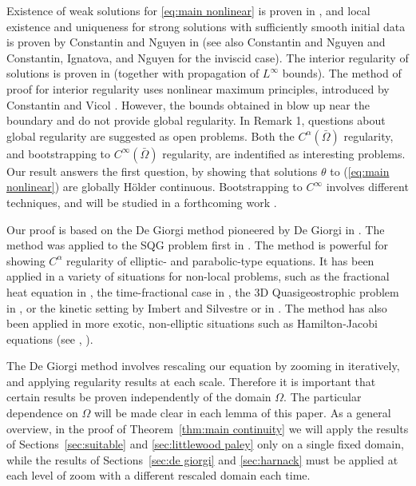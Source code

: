 \documentclass[11pt]{amsart}
\theoremstyle{remark}
\theoremstyle{definition}
\begin{document}
\vskip0.3cm
Existence of weak solutions for \eqref{eq:main nonlinear}  is proven in \cite{CoIg.fraclap}, and local existence and uniqueness for strong solutions with sufficiently smooth initial data is proven by Constantin and Nguyen in \cite{CoNg.strong} (see also Constantin and Nguyen \cite{CoNg} and Constantin, Ignatova, and Nguyen \cite{CoIgNg} for the inviscid case). The interior regularity of solutions  is proven in \cite{CoIg.sqg} (together with propagation of $L^\infty$ bounds).  The method of proof for interior regularity uses  nonlinear maximum principles, introduced by Constantin and Vicol \cite{CoVi}.   However, the bounds obtained in \cite{CoIg.sqg} blow up near the boundary and do not provide global regularity.
  In \cite{CoIg.sqg} Remark 1, questions about   global regularity are suggested as  open problems.  Both the $C^\alpha(\bar{\Omega})$ regularity,  and bootstrapping to  $C^\infty(\bar{\Omega})$ regularity, are indentified as interesting problems.  
  Our  result answers the first question, by  showing  that solutions $\theta$ to (\ref{eq:main nonlinear}) are globally H\"{o}lder continuous.
  Bootstrapping to $C^\infty$ involves different techniques, and will be studied in a forthcoming work \cite{StVa.higher}.  
\vskip0.3cm

Our proof is based on  the De Giorgi method pioneered by De Giorgi in \cite{DG}.  The method was applied to the SQG problem first in \cite{CaVa.sqg}.  The method is powerful for showing $C^\alpha$ regularity of elliptic- and parabolic-type equations. It has been applied in a variety of situations for non-local problems, such as the fractional heat equation in \cite{CaChVa.nio}, the time-fractional case in \cite{AlCaVa}, the 3D Quasigeostrophic problem in \cite{NoVa.qg}, or the kinetic setting by Imbert and Silvestre \cite{ImSi} or in \cite{St}.  The method has also been applied in more exotic, non-elliptic situations such as Hamilton-Jacobi equations (see \cite{ChVa}, \cite{StVa.hamjac}).  

The De Giorgi method involves rescaling our equation by zooming in iteratively, and applying regularity results at each scale.  Therefore it is important that certain results be proven independently of the domain $\Omega$.  
The particular dependence on $\Omega$ will be made clear in each lemma of this paper.  
As a general overview, in the proof of Theorem~\ref{thm:main continuity} we will apply the results of Sections~\ref{sec:suitable} and \ref{sec:littlewood paley} only on a single fixed domain, while the results of Sections~\ref{sec:de giorgi} and \ref{sec:harnack} must be applied at each level of zoom with a different rescaled domain each time.  
\end{document}
